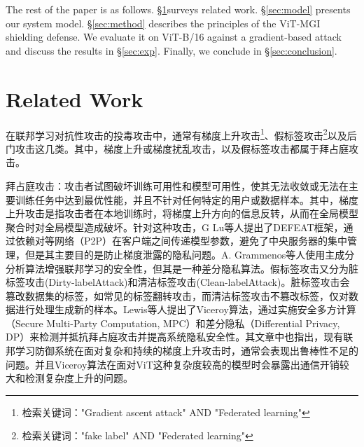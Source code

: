 \documentclass[conference]{IEEEtran}
\begin{document}
The rest of the paper is as follows. \hyperref[sec:related]{§\ref{sec:related}}surveys related work. \hyperref[sec:model]{§\ref{sec:model}} presents our system model. \hyperref[sec:method]{§\ref{sec:method}} describes the principles of the ViT-MGI shielding defense. We evaluate it on ViT-B/16 against a gradient-based attack and discuss the results in \hyperref[sec:exp]{§\ref{sec:exp}}. Finally, we conclude in \hyperref[sec:conclusion]{§\ref{sec:conclusion}}.






\section{Related Work}
\label{sec:related}

在联邦学习对抗性攻击的投毒攻击中，通常有梯度上升攻击\cite{gradientAscentAttack}\footnote{检索关键词："Gradient ascent attack" AND "Federated learning"}、假标签攻击\cite{fakeLabelAttack}\footnote{检索关键词："fake label" AND "Federated learning"}以及后门攻击\cite{how2backdoor}这几类。其中，梯度上升或梯度扰乱攻击，以及假标签攻击都属于拜占庭攻击。

拜占庭攻击：攻击者试图破坏训练可用性和模型可用性，使其无法收敛或无法在主要训练任务中达到最优性能，并且不针对任何特定的用户或数据样本。其中，梯度上升攻击是指攻击者在本地训练时，将梯度上升方向的信息反转，从而在全局模型聚合时对全局模型造成破坏\cite{gradientAscentAttack}。针对这种攻击，G Lu等人提出了DEFEAT框架\cite{gradientAscentAttack_privacy}，通过依赖对等网络（P2P）在客户端之间传递模型参数，避免了中央服务器的集中管理，但是其主要目的是防止梯度泄露的隐私问题。A. Grammenos等人使用主成分分析算法增强联邦学习的安全性\cite{federatedPCA}，但其是一种差分隐私算法。假标签攻击又分为脏标签攻击(Dirty-labelAttack)\cite{latentAttack}和清洁标签攻击(Clean-labelAttack)\cite{cleanLabelAttack}。脏标签攻击会篡改数据集的标签，如常见的标签翻转攻击\cite{tailAttack_SuchAsLabelFlip}，而清洁标签攻击不篡改标签，仅对数据进行处理生成新的样本。Lewis等人提出了Viceroy算法\cite{gradientAscentAttackAndLabelFlip}，通过实施安全多方计算（Secure Multi-Party Computation, MPC）和差分隐私（Differential Privacy, DP）来检测并抵抗拜占庭攻击并提高系统隐私安全性。其文章中也指出，现有联邦学习防御系统在面对复杂和持续的梯度上升攻击时，通常会表现出鲁棒性不足的问题。并且Viceroy算法在面对ViT这种复杂度较高的模型时会暴露出通信开销较大和检测复杂度上升的问题。
\end{document}
